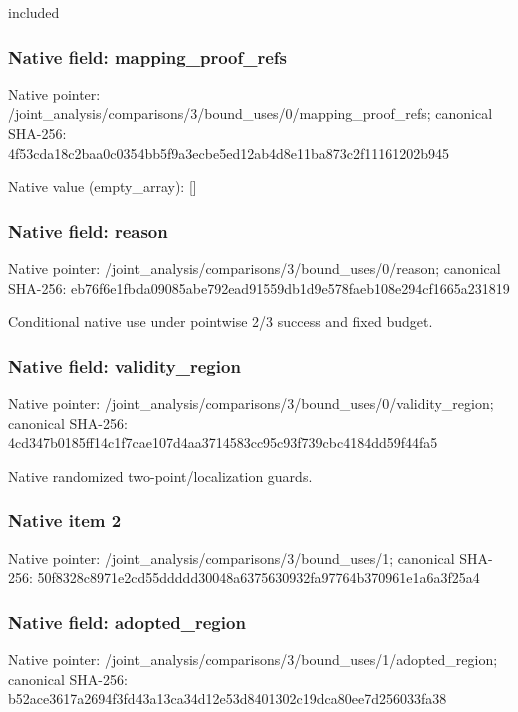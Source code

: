 \documentclass[10pt,a4paper]{article}
\begin{document}
\begingroup\raggedright\sloppy included\par\endgroup

\subsubsection{Native field: mapping\_\allowbreak{}proof\_\allowbreak{}refs}
Native pointer: /joint\_\allowbreak{}analysis/comparisons/3/bound\_\allowbreak{}uses/0/mapping\_\allowbreak{}proof\_\allowbreak{}refs; canonical SHA-256: 4f53cda18c2baa0c0354bb5f9a3ecbe5ed12ab4d8e11ba873c2f11161202b945

Native value (empty\_\allowbreak{}array): []

\subsubsection{Native field: reason}
Native pointer: /joint\_\allowbreak{}analysis/comparisons/3/bound\_\allowbreak{}uses/0/reason; canonical SHA-256: eb76f6e1fbda09085abe792ead91559db1d9e578faeb108e294cf1665a231819

\begingroup\raggedright\sloppy Conditional native use under pointwise 2/\allowbreak{}3 success and fixed budget.\par\endgroup

\subsubsection{Native field: validity\_\allowbreak{}region}
Native pointer: /joint\_\allowbreak{}analysis/comparisons/3/bound\_\allowbreak{}uses/0/validity\_\allowbreak{}region; canonical SHA-256: 4cd347b0185ff14c1f7cae107d4aa3714583cc95c93f739cbc4184dd59f44fa5

\begingroup\raggedright\sloppy Native randomized two-point/\allowbreak{}localization guards.\par\endgroup

\subsubsection{Native item 2}
Native pointer: /joint\_\allowbreak{}analysis/comparisons/3/bound\_\allowbreak{}uses/1; canonical SHA-256: 50f8328c8971e2cd55ddddd30048a6375630932fa97764b370961e1a6a3f25a4

\subsubsection{Native field: adopted\_\allowbreak{}region}
Native pointer: /joint\_\allowbreak{}analysis/comparisons/3/bound\_\allowbreak{}uses/1/adopted\_\allowbreak{}region; canonical SHA-256: b52ace3617a2694f3fd43a13ca34d12e53d8401302c19dca80ee7d256033fa38
\end{document}

